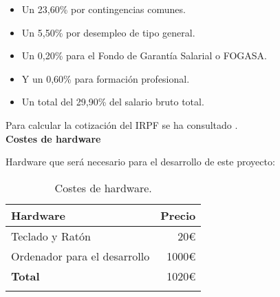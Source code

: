 \begin{itemize}
\item
	Un 23,60\% por contingencias comunes.
\item
	Un 5,50\% por desempleo de tipo general.
\item
	Un 0,20\% para el Fondo de Garantía Salarial o FOGASA.
\item
	Y un 0,60\% para formación profesional.
\item
	Un total del 29,90\% del salario bruto total.
\end{itemize}

Para calcular la cotización del IRPF se ha consultado \cite{irpfgob}.\\

\textbf{Costes de hardware}

Hardware que será necesario para el desarrollo de este proyecto:

\begin{longtable}[]{@{}lr@{}}
\toprule
\begin{minipage}[b]{0.38\columnwidth}\raggedright\strut
\textbf{Hardware}\strut
\end{minipage} & \begin{minipage}[b]{0.20\columnwidth}\raggedright\strut
\textbf{Precio}\strut
\end{minipage}\tabularnewline
\midrule
\endhead
\begin{minipage}[t]{0.38\columnwidth}\raggedright\strut
Teclado y Ratón\strut
\end{minipage} & \begin{minipage}[t]{0.20\columnwidth}\raggedright\strut
20\euro{}\strut
\end{minipage}\tabularnewline
\begin{minipage}[t]{0.38\columnwidth}\raggedright\strut
Ordenador para el desarrollo\strut
\end{minipage} & \begin{minipage}[t]{0.20\columnwidth}\raggedright\strut
1000\euro{}\strut
\end{minipage}\tabularnewline
\midrule
\begin{minipage}[t]{0.38\columnwidth}\raggedright\strut
\textbf{Total}\strut
\end{minipage} & \begin{minipage}[t]{0.20\columnwidth}\raggedright\strut
1020\euro{}\strut
\end{minipage}\tabularnewline
\bottomrule
\caption{Costes de hardware.}
\end{longtable}

